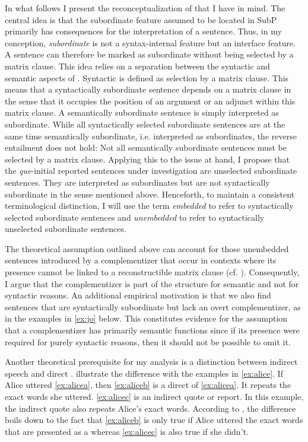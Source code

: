 In what follows I present the reconceptualization of  that I have in mind. The central idea  is that the subordinate feature assumed to be located in SubP primarily has  consequences for the interpretation of a sentence.  Thus, in my conception,  \emph{subordinate} is not a syntax-internal feature but an interface feature.  A sentence can therefore  be  marked as subordinate without being selected by a matrix clause. This idea relies on a   separation between the syntactic and semantic aspects of . Syntactic  is defined as selection by a  matrix clause. This means that a syntactically subordinate sentence depends  on a matrix clause in the sense that it occupies the position of an argument or an adjunct within this matrix clause. A semantically subordinate sentence is simply interpreted as subordinate. While all syntactically selected subordinate sentences are at the same time semantically subordinate, i.e. interpreted as subordinates,  the reverse entailment does not hold: Not all semantically subordinate sentences must be selected by a matrix clause. Applying this to the issue at hand,  I propose that the \emph{que}-initial reported sentences under investigation are unselected subordinate sentences. They are  interpreted as subordinates but are not syntactically subordinate in the sense mentioned above. Henceforth, to maintain a  consistent terminological distinction, I will use the term \emph{embedded} to refer to  syntactically selected subordinate sentences and \emph{unembedded} to refer to syntactically unselected subordinate sentences.\largerpage
 
 
The  theoretical assumption  outlined above can account for those unembedded sentences introduced by a complementizer that occur in contexts where its presence cannot be linked to a reconstructible matrix clause (cf. ). Consequently, I argue that the complementizer is part of the structure for semantic and not for syntactic reasons. 
An additional empirical  motivation is that  we also find  sentences that are syntactically subordinate but lack an overt complementizer, as in the examples in \eqref{ex:jo} below.    This constitutes evidence for the assumption that a complementizer has primarily semantic functions since  if its presence were required  for purely syntactic reasons, then it should not be possible to omit it.



Another theoretical prerequisite for my analysis is a distinction between indirect speech and direct . \citet{Cappelen1997} illustrate the difference with the examples in \eqref{ex:alice}. If Alice uttered \eqref{ex:alicea}, then \eqref{ex:aliceb} is a direct  of \eqref{ex:alicea}. It repeats the exact  words she uttered. \eqref{ex:alicec} is an indirect quote or report. In this example,  the indirect quote also repeats Alice's exact words. According to \citet{Cappelen1997}, the difference boils down to the fact that \eqref{ex:aliceb} is only true if Alice uttered the exact words that are presented as a  whereas \eqref{ex:alicec} is also true if she didn't. 

